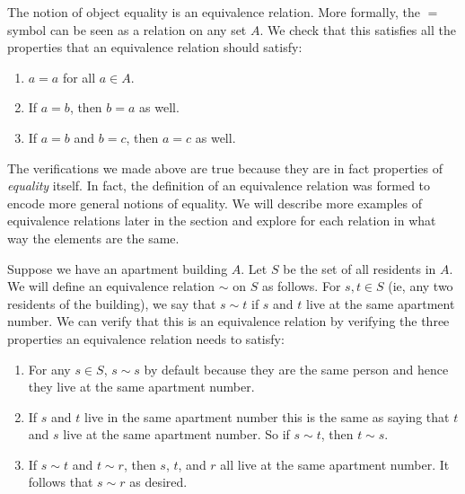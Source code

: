 \begin{example}
The notion of object equality is an equivalence relation. More formally, the $=$ symbol can be seen as a relation on any set $A$. We check that this satisfies all the properties that an equivalence relation should satisfy:
\begin{enumerate}
	\item $a = a$ for all $a \in A$.
	\item If $a = b$, then $b = a$ as well.
	\item If $a = b$ and $b = c$, then $a = c$ as well.
\end{enumerate}
\end{example}
The verifications we made above are true because they are in fact properties of \textit{equality} itself. In fact, the definition of an equivalence relation was formed to encode more general notions of equality. We will describe more examples of equivalence relations later in the section and explore for each relation in what way the elements are the same. 

\begin{example}\label{apt1_eqr}
Suppose we have an apartment building $A$. Let $S$ be the set of all residents in $A$. We will define an equivalence relation $\sim$ on $S$ as follows. For $s, t \in S$ (ie, any two residents of the building), we say that $s \sim t$ if $s$ and $t$ live at the same apartment number. We can verify that this is an equivalence relation by verifying the three properties an equivalence relation needs to satisfy:
\begin{enumerate}
	\item For any $s \in S$, $s \sim s$ by default because they are the same person and hence they live at the same apartment number.
	\item If $s$ and $t$ live in the same apartment number this is the same as saying that $t$ and $s$ live at the same apartment number. So if $s \sim t$, then $t \sim s$.
	\item If $s \sim t$ and $t \sim r$, then $s$, $t$, and $r$ all live at the same apartment number. It follows that $s \sim r$ as desired.
\end{enumerate}
\end{example}

